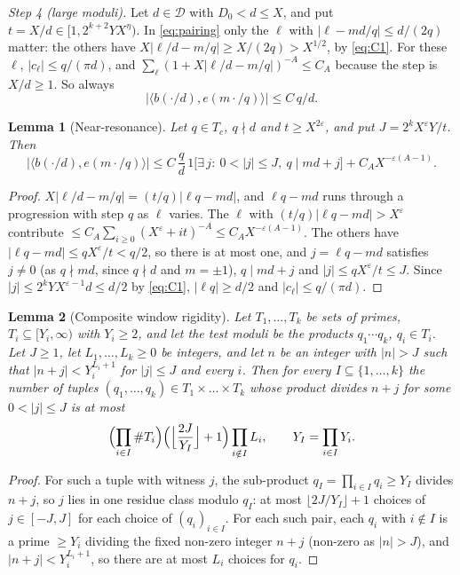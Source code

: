 \documentclass[11pt]{amsart}
\newtheorem{lemma}{Lemma}[section]
\theoremstyle{remark}
\numberwithin{equation}{section}
\newcommand{\cD}{\mathcal{D}}
\newcommand{\eps}{\varepsilon}
\begin{document}
\emph{Step 4 (large moduli).} Let $d\in\cD$ with $D_0<d\le X$, and put $t=X/d\in[1,2^{k+2}YX^{\eta})$. In \eqref{eq:pairing} only the $\ell$ with $|\ell-md/q|\le d/(2q)$ matter: the others have $X|\ell/d-m/q|\ge X/(2q)>X^{1/2}$, by \eqref{eq:C1}. For these $\ell$, $|c_\ell|\le q/(\pi d)$, and $\sum_\ell(1+X|\ell/d-m/q|)^{-A}\le C_A$ because the step is $X/d\ge1$. So always
\begin{equation}\label{eq:crude}
|\langle b(\cdot/d),e(m\cdot/q)\rangle|\le C\,q/d .
\end{equation}

\begin{lemma}[Near-resonance]\label{lem:nearres}
Let $q\in T_c$, $q\nmid d$ and $t\ge X^{2\eps}$, and put $J=2^kX^{\eps}Y/t$. Then
\[
|\langle b(\cdot/d),e(m\cdot/q)\rangle|\le C\,\frac qd\,1\bigl[\exists\,j:\ 0<|j|\le J,\ q\mid md+j\bigr]+C_AX^{-\eps(A-1)} .
\]
\end{lemma}

\begin{proof}
$X|\ell/d-m/q|=(t/q)|\ell q-md|$, and $\ell q-md$ runs through a progression with step $q$ as $\ell$ varies. The $\ell$ with $(t/q)|\ell q-md|>X^{\eps}$ contribute $\le C_A\sum_{i\ge0}(X^{\eps}+it)^{-A}\le C_AX^{-\eps(A-1)}$. The others have $|\ell q-md|\le qX^{\eps}/t<q/2$, so there is at most one, and $j=\ell q-md$ satisfies $j\ne0$ (as $q\nmid md$, since $q\nmid d$ and $m=\pm1$), $q\mid md+j$ and $|j|\le qX^\eps/t\le J$. Since $|j|\le 2^kYX^{\eps-1}d\le d/2$ by \eqref{eq:C1}, $|\ell q|\ge d/2$ and $|c_\ell|\le q/(\pi d)$.
\end{proof}

\begin{lemma}[Composite window rigidity]\label{lem:rigidity}
Let $T_1,\dots,T_k$ be sets of primes, $T_i\subseteq[Y_i,\infty)$ with $Y_i\ge2$, and let the test moduli be the products $q_1\cdots q_k$, $q_i\in T_i$. Let $J\ge1$, let $L_1,\dots,L_k\ge0$ be integers, and let $n$ be an integer with $|n|>J$ such that $|n+j|<Y_i^{L_i+1}$ for $|j|\le J$ and every $i$. Then for every $I\subseteq\{1,\dots,k\}$ the number of tuples $(q_1,\dots,q_k)\in T_1\times\dots\times T_k$ whose product divides $n+j$ for some $0<|j|\le J$ is at most
\[
\Bigl(\prod_{i\in I}\#T_i\Bigr)\Bigl(\Bigl\lfloor\frac{2J}{Y_I}\Bigr\rfloor+1\Bigr)\prod_{i\notin I}L_i,\qquad Y_I=\prod_{i\in I}Y_i .
\]
\end{lemma}

\begin{proof}
For such a tuple with witness $j$, the sub-product $q_I=\prod_{i\in I}q_i\ge Y_I$ divides $n+j$, so $j$ lies in one residue class modulo $q_I$: at most $\lfloor2J/Y_I\rfloor+1$ choices of $j\in[-J,J]$ for each choice of $(q_i)_{i\in I}$. For each such pair, each $q_i$ with $i\notin I$ is a prime $\ge Y_i$ dividing the fixed non-zero integer $n+j$ (non-zero as $|n|>J$), and $|n+j|<Y_i^{L_i+1}$, so there are at most $L_i$ choices for $q_i$.
\end{proof}
\end{document}
